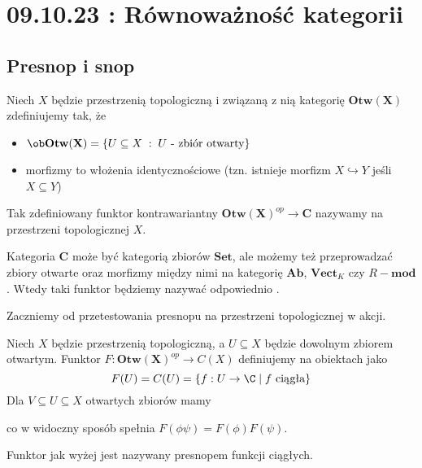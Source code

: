 \section{09.10.23 : Równoważność kategorii}

\subsection{Presnop i snop}

  Niech $X$ będzie przestrzenią topologiczną i związaną z nią kategorię $\mathbf{Otw(X)}$ zdefiniujemy tak, że
  \begin{itemize}
    \item $\ob\mathbf{Otw(X)}=\{U\subseteq X\;:\;U\text{ - zbiór otwarty}\}$
    \item morfizmy to włożenia identycznościowe (tzn. istnieje morfizm $X\hookrightarrow Y$ jeśli $X\subseteq Y$)
  \end{itemize}

  Tak zdefiniowany funktor kontrawariantny $\mathbf{Otw(X)}^{op}\to \mathbf{C}$ nazywamy  na przestrzeni topologicznej $X$.

  Kategoria $\mathbf{C}$ może być kategorią zbiorów $\mathbf{Set}$, ale możemy też przeprowadzać zbiory otwarte oraz morfizmy między nimi na kategorię $\mathbf{Ab}$, $\mathbf{Vect}_K$ czy $R-\mathbf{mod}$. Wtedy taki funktor będziemy nazywać odpowiednio .

\begin{example}
\item Zaczniemy od przetestowania presnopu na przestrzeni topologicznej w akcji.

  Niech $X$ będzie przestrzenią topologiczną, a $U\subseteq X$ będzie dowolnym zbiorem otwartym. Funktor $F:\mathbf{Otw(X)}^{op}\to {C(X)}$ definiujemy na obiektach jako
  $$F(U)=C(U)=\{f:U\to\C\;|\;f\text{ ciągła}\}$$
  Dla $V\subseteq U\subseteq X$ otwartych zbiorów mamy

  \begin{center}
  \end{center}

  co w widoczny sposób spełnia $F(\phi\psi)=F(\phi)F(\psi)$.

  Funktor jak wyżej jest nazywany presnopem funkcji ciągłych.
\end{example}

